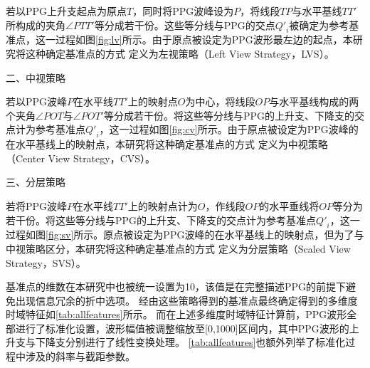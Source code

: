 若以PPG上升支起点为原点$T$，同时将PPG波峰设为$P$，将线段$TP$与水平基线$TT'$所构成的夹角$\angle PTT'$等分成若干份。这些等分线与PPG的交点${Q'}_i$被确定为参考基准点，这一过程如图\autoref{fig:lv}所示。由于原点被设定为PPG波形最左边的起点，本研究将这种确定基准点的方式
定义为左视策略（Left View Strategy，LVS）。

二、中视策略

若以PPG波峰$P$在水平线$TT'$上的映射点$O$为中心，将线段$OP$与水平基线构成的两个夹角$\angle POT$与$\angle POT'$等分成若干份。将这些等分线与PPG的上升支、下降支的交点计为参考基准点${Q'}_i$，这一过程如图\autoref{fig:cv}所示。由于原点被设定为PPG波峰的在水平基线上的映射点，本研究将这种确定基准点的方式
定义为中视策略（Center View Strategy，CVS）。

三、分层策略

若将PPG波峰$P$在水平线$TT'$上的映射点计为$O$，作线段$OP$的水平垂线将$OP$等分为若干份。将这些等分线与PPG的上升支、下降支的交点计为参考基准点${Q'}_i$，这一过程如图\autoref{fig:sv}所示。原点被设定为PPG波峰的在水平基线上的映射点，但为了与中视策略区分，本研究将这种确定基准点的方式
定义为分层策略（Scaled View Strategy，SVS）。


基准点的维数在本研究中也被统一设置为10，该值是在完整描述PPG的前提下避免出现信息冗余的折中选项。
经由这些策略得到的基准点最终确定得到的多维度时域特征如\autoref{tab:allfeatures}所示。
而在上述多维度时域特征计算前，PPG波形全部进行了标准化设置，波形幅值被调整缩放至[0,1000]区间内，其中PPG波形的上升支与下降支分别进行了线性变换处理。
\autoref{tab:allfeatures}也额外列举了标准化过程中涉及的斜率与截距参数。

